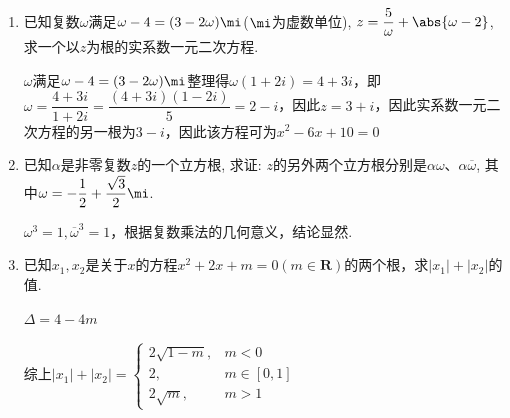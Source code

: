 \begin{enumerate}
    \item 已知复数$\omega$满足$\omega-4=(3-2\omega)\mi$($\mi$为虚数单位), $z=\dfrac{5}{\omega}+\abs{\omega-2}$, 求一个以$z$为根的实系数一元二次方程. 
    \begin{jieda}
        $\omega$满足$\omega-4=(3-2\omega)\mi$整理得$\omega(1+2i) = 4+3i$，即$\omega = \dfrac{4+3i}{1+2i} = \dfrac{(4+3i)(1-2i)}{5} = 2-i$，因此$z = 3+i$，因此实系数一元二次方程的另一根为$3-i$，因此该方程可为$x^2 - 6x + 10 = 0$
    \end{jieda}

    \item 已知$\alpha$是非零复数$z$的一个立方根, 求证: $z$的另外两个立方根分别是$\alpha\omega$、$\alpha\overline{\omega}$, 其中$\omega=-\dfrac{1}{2}+\dfrac{\sqrt{3}}{2}\mi$. 
    \begin{jieda}
        $\omega^3 = 1, \overline{\omega}^3 = 1$，根据复数乘法的几何意义，结论显然.
    \end{jieda}
    
    \item 已知$x_1, x_2$是关于$x$的方程$x^2+2x+m=0(m \in \mathbf{R})$的两个根，求$|x_1| + |x_2|$的值.
        \begin{jieda}
            $\Delta = 4 - 4m$
            综上$|x_1|+|x_2| = \left \{ \begin{array}{ll}
                     2\sqrt{1-m}, &  m < 0 \\
                     2, & m \in [0, 1] \\
                     2\sqrt{m}, & m > 1
                \end{array} \right.$
        \end{jieda}
    


\end{enumerate}
